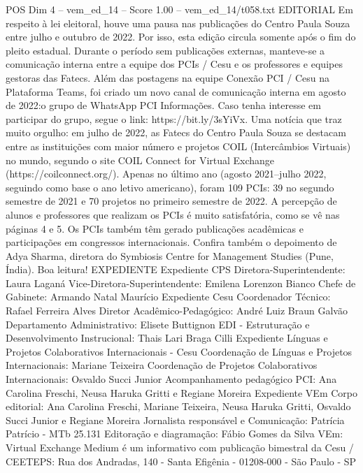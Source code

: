 \begin{textsample}{POS Dim 4 – vem\_ed\_14 – Score 1.00 – vem\_ed\_14/t058.txt}  \label{ex:f4_pos_150}
EDITORIAL Em respeito à lei eleitoral, houve uma pausa nas publicações do Centro Paula Souza entre julho e outubro de 2022.
Por isso, esta edição circula somente após o fim do pleito estadual.
Durante o período sem publicações externas, manteve-se a comunicação interna entre a equipe dos PCIs / Cesu e os professores e equipes gestoras das Fatecs.
Além das postagens na equipe Conexão PCI / Cesu na Plataforma Teams, foi criado um novo canal de comunicação interna em agosto de 2022:o grupo de WhatsApp PCI Informações.
Caso tenha interesse em participar do grupo, segue o link: https://bit.ly/3sYiVx.
Uma notícia que traz muito orgulho: em julho de 2022, as Fatecs do Centro Paula Souza se destacam entre as instituições com maior número e projetos COIL (Intercâmbios Virtuais) no mundo, segundo o site COIL Connect for Virtual Exchange (https://coilconnect.org/).
Apenas no último ano (agosto 2021–julho 2022, seguindo como base o ano letivo americano), foram 109 PCIs: 39 no segundo semestre de 2021 e 70 projetos no primeiro semestre de 2022.
A percepção de alunos e professores que realizam os PCIs é muito satisfatória, como se vê nas páginas 4 e 5.
Os PCIs também têm gerado publicações acadêmicas e participações em congressos internacionais.
Confira também o depoimento de Adya Sharma, diretora do Symbiosis Centre for Management Studies (Pune, Índia).
Boa leitura!
EXPEDIENTE Expediente CPS Diretora-Superintendente: Laura Laganá Vice-Diretora-Superintendente: Emilena Lorenzon Bianco Chefe de Gabinete: Armando Natal Maurício Expediente Cesu Coordenador Técnico: Rafael Ferreira Alves Diretor Acadêmico-Pedagógico: André Luiz Braun Galvão Departamento Administrativo: Elisete Buttignon EDI - Estruturação e Desenvolvimento Instrucional: Thais Lari Braga Cilli Expediente Línguas e Projetos Colaborativos Internacionais - Cesu Coordenação de Línguas e Projetos Internacionais: Mariane Teixeira Coordenação de Projetos Colaborativos Internacionais: Osvaldo Succi Junior Acompanhamento pedagógico PCI: Ana Carolina Freschi, Neusa Haruka Gritti e Regiane Moreira Expediente VEm Corpo editorial: Ana Carolina Freschi, Mariane Teixeira, Neusa Haruka Gritti, Osvaldo Succi Junior e Regiane Moreira Jornalista responsável e Comunicação: Patrícia Patrício - MTb 25.131 Editoração e diagramação: Fábio Gomes da Silva VEm: Virtual Exchange Medium é um informativo com publicação bimestral da Cesu / CEETEPS: Rua dos Andradas, 140 - Santa Efigênia - 01208-000 - São Paulo - SP

\end{textsample}
